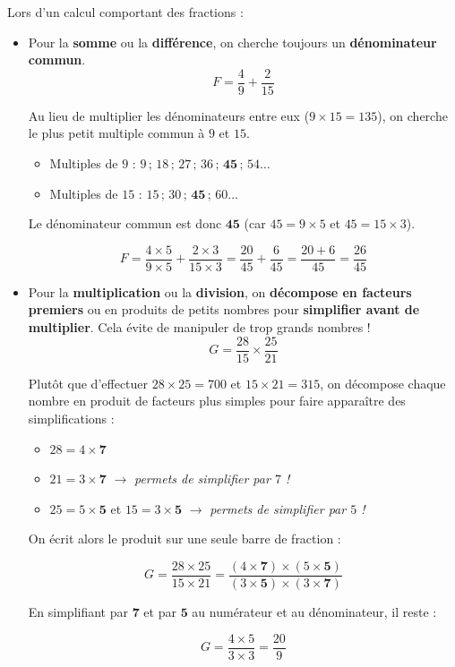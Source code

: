 \begin{meth}
	Lors d'un calcul comportant des fractions :
	\begin{itemize}
		\item Pour la \textbf{somme} ou la \textbf{différence}, on cherche toujours un \textbf{dénominateur commun}.
		      \[
			      F = \frac{4}{9} + \frac{2}{15}
		      \]

		      Au lieu de multiplier les dénominateurs entre eux ($9 \times 15 = 135$), on cherche le plus petit multiple commun à $9$ et $15$.

		      \begin{itemize}
			      \item Multiples de $9$ : $9\,;\, 18\,;\, 27\,;\, 36\,;\, \mathbf{45}\,;\, 54 \dots$
			      \item Multiples de $15$ : $15\,;\, 30\,;\, \mathbf{45}\,;\, 60 \dots$
		      \end{itemize}

		      Le dénominateur commun est donc $\mathbf{45}$ (car $45 = 9 \times 5$ et $45 = 15 \times 3$).

		      \[
			      F = \frac{4 \times 5}{9 \times 5} + \frac{2 \times 3}{15 \times 3} = \frac{20}{45} + \frac{6}{45} = \frac{20 + 6}{45} = \frac{26}{45}
		      \]
		\item Pour la \textbf{multiplication} ou la \textbf{division}, on \textbf{décompose en facteurs premiers} ou en produits de petits nombres pour \textbf{simplifier avant de multiplier}. Cela évite de manipuler de trop grands nombres !
		      \[
			      G = \frac{28}{15} \times \frac{25}{21}
		      \]

		      Plutôt que d'effectuer $28 \times 25 = 700$ et $15 \times 21 = 315$, on décompose chaque nombre en produit de facteurs plus simples pour faire apparaître des simplifications :

		      \begin{itemize}
			      \item $28 = 4 \times \mathbf{7}$
			      \item $21 = 3 \times \mathbf{7}$ \quad $\rightarrow$ \textit{permets de simplifier par $7$ !}
			      \item $25 = 5 \times \mathbf{5}$ et $15 = 3 \times \mathbf{5}$ \quad $\rightarrow$ \textit{permets de simplifier par $5$ !}
		      \end{itemize}

		      On écrit alors le produit sur une seule barre de fraction :

		      \[
			      G = \frac{28 \times 25}{15 \times 21} = \frac{(4 \times \mathbf{7}) \times (5 \times \mathbf{5})}{(3 \times \mathbf{5}) \times (3 \times \mathbf{7})}
		      \]

		      En simplifiant par $\mathbf{7}$ et par $\mathbf{5}$ au numérateur et au dénominateur, il reste :

		      \[
			      G = \frac{4 \times 5}{3 \times 3} = \frac{20}{9}
		      \]
	\end{itemize}
\end{meth}


